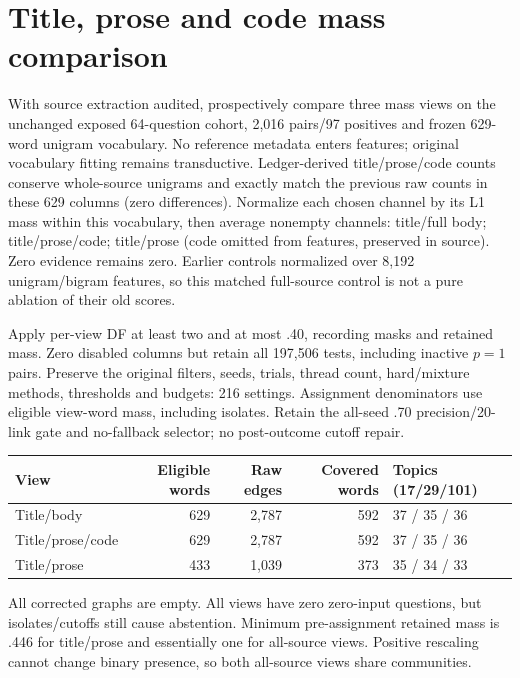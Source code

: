 \documentclass[11pt]{article}
\begin{document}
\section{Title, prose and code mass comparison}
With source extraction audited, prospectively compare three mass views on the
unchanged exposed 64-question cohort, 2,016 pairs/97 positives and frozen
629-word unigram vocabulary. No reference metadata enters features; original
vocabulary fitting remains transductive. Ledger-derived title/prose/code counts
conserve whole-source unigrams and exactly match the previous raw counts in these
629 columns (zero differences). Normalize each chosen channel by its L1 mass
within this vocabulary, then average nonempty channels: title/full body;
title/prose/code; title/prose (code omitted from features, preserved in source).
Zero evidence remains zero. Earlier controls normalized over 8,192 unigram/bigram
features, so this matched full-source control is not a pure ablation of their
old scores.

Apply per-view DF at least two and at most .40, recording masks and retained
mass. Zero disabled columns but retain all 197,506 tests, including inactive
$p=1$ pairs. Preserve the original filters, seeds, trials, thread count,
hard/mixture methods, thresholds and budgets: 216 settings. Assignment denominators
use eligible view-word mass, including isolates. Retain the all-seed .70
precision/20-link gate and no-fallback selector; no post-outcome cutoff repair.

\begin{center}\small
\begin{tabular}{lrrrl}\toprule
View & Eligible words & Raw edges & Covered words & Topics (17/29/101)\\\midrule
Title/body & 629 & 2,787 & 592 & 37 / 35 / 36\\
Title/prose/code & 629 & 2,787 & 592 & 37 / 35 / 36\\
Title/prose & 433 & 1,039 & 373 & 35 / 34 / 33\\\bottomrule
\end{tabular}\end{center}
All corrected graphs are empty. All views have zero zero-input questions, but
isolates/cutoffs still cause abstention. Minimum pre-assignment retained mass is
.446 for title/prose and essentially one for all-source views. Positive rescaling
cannot change binary presence, so both all-source views share communities.
\end{document}
